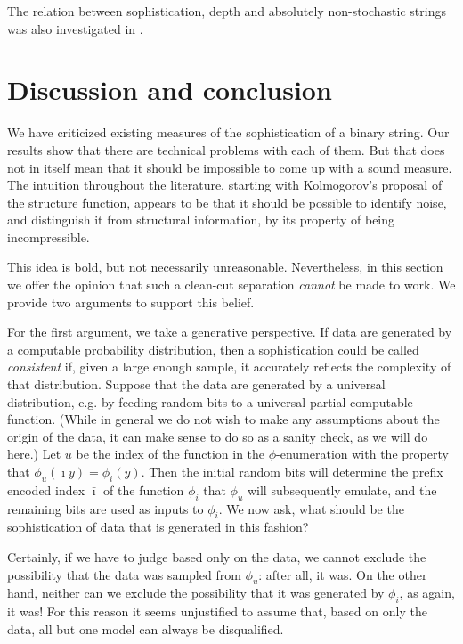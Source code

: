 \documentclass{style/llncs}
\begin{document}
The relation between sophistication, depth and absolutely non-stochastic strings was also investigated in \cite{antunes2013sophistication}.

\section{Discussion and conclusion}
\label{section:conclusion}

We have criticized existing measures of the sophistication of a binary string. Our results show that there are technical problems with each of them. But that does not in itself mean that it should be impossible to come up with a sound measure. The intuition throughout the literature, starting with Kolmogorov's proposal of the structure function, appears to be that it should be possible to identify noise, and distinguish it from structural information, by its property of being incompressible.

This idea is bold, but not necessarily unreasonable. Nevertheless, in this section we offer the opinion that such a clean-cut separation \emph{cannot} be made to work. We provide two arguments to support this belief.

For the first argument, we take a generative perspective. If data are generated by a computable probability distribution, then a sophistication could be called \emph{consistent} if, given a large enough sample, it accurately reflects the complexity of that distribution. Suppose that the data are generated by a universal distribution, e.g. by feeding random bits to a universal partial computable function. (While in general we do not wish to make any assumptions about the origin of the data, it can make sense to do so as a sanity check, as we will do here.) Let $u$ be the index of the function in the $\phi$-enumeration with the property that $\phi_u(\bar\imath y)=\phi_i(y)$. Then the initial random bits will determine the prefix encoded index $\bar\imath$ of the function $\phi_i$ that $\phi_u$ will subsequently emulate, and the remaining bits are used as inputs to $\phi_i$. We now ask, what should be the sophistication of data that is generated in this fashion?

Certainly, if we have to judge based only on the data, we cannot exclude the possibility that the data was sampled from $\phi_u$: after all, it was.  On the other hand, neither can we exclude the possibility that it was generated by $\phi_i$, as again, it was! For this reason it seems unjustified to assume that, based on only the data, all but one model can always be disqualified.
\end{document}
